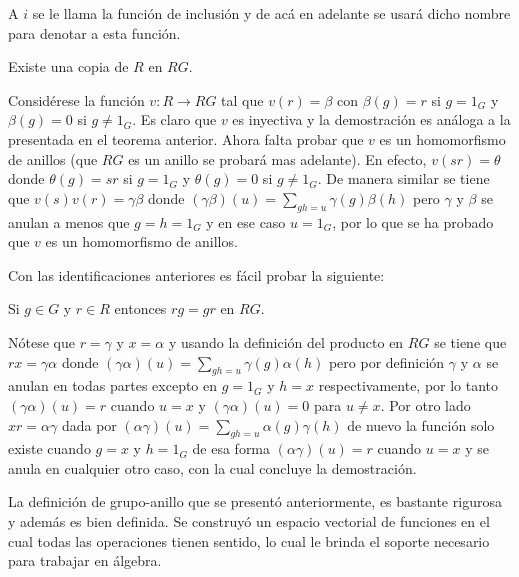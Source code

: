 A $i$ se le llama la función de inclusión y de acá en adelante se usará dicho nombre para denotar a esta función.

\begin{teorema}
Existe una copia de $R$ en $RG$.
\end{teorema}


\begin{proof*}
Considérese la función $v \colon R \to RG$ tal que $v(r) = \beta$ con $\beta(g) = r$ si $ g = 1_G $ y $\beta(g)=0$ si $g \neq 1_G$. Es claro que $v$ es inyectiva y la demostración es análoga a la presentada en el teorema anterior. Ahora falta probar que $v$ es un homomorfismo de anillos (que $RG$ es un anillo se probará mas adelante). En efecto, $v(sr)=\theta$ donde $\theta(g)=sr$ si $g=1_G$ y $\theta(g) = 0$ si $g \neq 1_G$. De manera similar se tiene que $v(s)v(r)=\gamma\beta$ donde $(\gamma\beta)(u)=\sum_{gh=u}\gamma(g)\beta(h) $ pero $\gamma $ y $\beta$ se anulan a menos que $g=h=1_G$ y en ese caso $u=1_G$, por lo que se ha probado que $v$ es un homomorfismo de anillos. \qedhere
\end{proof*}
Con las identificaciones anteriores es fácil probar la siguiente: 
\begin{propiedad}
Si $g \in G$ y $r \in R$ entonces $rg=gr$ en $RG$.
\end{propiedad}
\begin{proof*}
Nótese que $r=\gamma$ y $x=\alpha$ y usando la definición del producto en $RG$ se tiene que $rx=\gamma\alpha$ donde $(\gamma\alpha)(u)=\sum_{gh=u}\gamma(g) \alpha(h) $ pero por definición $\gamma$ y $\alpha$ se anulan en todas partes excepto en $g=1_G$ y $h=x$ respectivamente, por lo tanto $(\gamma\alpha)(u)=r$ cuando $u=x$ y $(\gamma\alpha)(u)=0$ para $u \neq x $.
Por otro lado $xr=\alpha\gamma$ dada por $(\alpha\gamma)(u)=\sum_{gh=u}\alpha(g)\gamma(h)$ de nuevo la función solo existe cuando $g=x$ y $h=1_G$ de esa forma $(\alpha\gamma)(u)=r$ cuando $u=x$ y se anula en cualquier otro caso, con la cual concluye la demostración.
\end{proof*}

La definición de grupo-anillo que se presentó anteriormente, es bastante rigurosa y además es bien definida. Se construyó un espacio vectorial de funciones en el cual todas las operaciones tienen sentido, lo cual le brinda el soporte necesario para trabajar en álgebra. 

